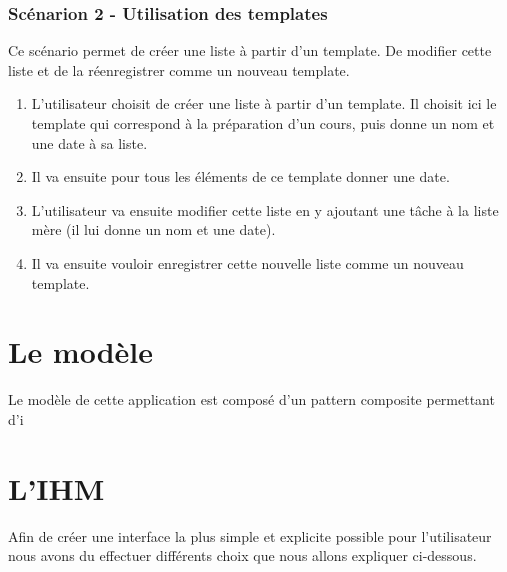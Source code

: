 \documentclass[a4paper,10pt]{article}
\begin{document}
\subsubsection{Scénarion 2 - Utilisation des templates}
Ce scénario permet de créer une liste à partir d'un template. De modifier cette liste et de la réenregistrer comme un nouveau template.
\begin{enumerate}
\item{L'utilisateur choisit de créer une liste à partir d'un template. Il choisit ici le template qui correspond à la préparation d'un cours, puis donne un nom et une date à sa liste.}
\item{Il va ensuite pour tous les éléments de ce template donner une date.}
\item{L'utilisateur va ensuite modifier cette liste en y ajoutant une tâche à la liste mère (il lui donne un nom et une date).}
\item{Il va ensuite vouloir enregistrer cette nouvelle liste comme un nouveau template.}
\end{enumerate}


\newpage
\section{Le modèle}

Le modèle de cette application est composé d'un pattern composite permettant d'i 


\newpage
\section{L'IHM}

Afin de créer une interface la plus simple et explicite possible pour l'utilisateur nous avons du effectuer différents choix que nous allons expliquer ci-dessous.
\end{document}
